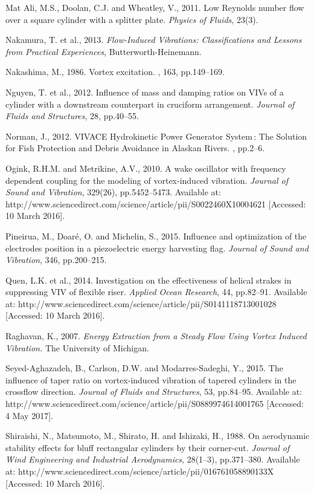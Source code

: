 \documentclass[]{article}
\begin{document}
Mat Ali, M.S., Doolan, C.J. and Wheatley, V., 2011. Low Reynolds number
flow over a square cylinder with a splitter plate. \emph{Physics of
Fluids}, 23(3).

Nakamura, T. et al., 2013. \emph{Flow-Induced Vibrations:
Classifications and Lessons from Practical Experiences},
Butterworth-Heinemann.

Nakashima, M., 1986. Vortex excitation. , 163, pp.149--169.

Nguyen, T. et al., 2012. Influence of mass and damping ratios on VIVs of
a cylinder with a downstream counterpart in cruciform arrangement.
\emph{Journal of Fluids and Structures}, 28, pp.40--55.

Norman, J., 2012. VIVACE Hydrokinetic Power Generator System : The
Solution for Fish Protection and Debris Avoidance in Alaskan Rivers. ,
pp.2--6.

Ogink, R.H.M. and Metrikine, A.V., 2010. A wake oscillator with
frequency dependent coupling for the modeling of vortex-induced
vibration. \emph{Journal of Sound and Vibration}, 329(26),
pp.5452--5473. Available at:
http://www.sciencedirect.com/science/article/pii/S0022460X10004621
{[}Accessed: 10 March 2016{]}.

Pineirua, M., Doaré, O. and Michelin, S., 2015. Influence and
optimization of the electrodes position in a piezoelectric energy
harvesting flag. \emph{Journal of Sound and Vibration}, 346,
pp.200--215.

Quen, L.K. et al., 2014. Investigation on the effectiveness of helical
strakes in suppressing VIV of flexible riser. \emph{Applied Ocean
Research}, 44, pp.82--91. Available at:
http://www.sciencedirect.com/science/article/pii/S0141118713001028
{[}Accessed: 10 March 2016{]}.

Raghavan, K., 2007. \emph{Energy Extraction from a Steady Flow Using
Vortex Induced Vibration.} The University of Michigan.

Seyed-Aghazadeh, B., Carlson, D.W. and Modarres-Sadeghi, Y., 2015. The
influence of taper ratio on vortex-induced vibration of tapered
cylinders in the crossflow direction. \emph{Journal of Fluids and
Structures}, 53, pp.84--95. Available at:
http://www.sciencedirect.com/science/article/pii/S0889974614001765
{[}Accessed: 4 May 2017{]}.

Shiraishi, N., Matsumoto, M., Shirato, H. and Ishizaki, H., 1988. On
aerodynamic stability effects for bluff rectangular cylinders by their
corner-cut. \emph{Journal of Wind Engineering and Industrial
Aerodynamics}, 28(1--3), pp.371--380. Available at:
http://www.sciencedirect.com/science/article/pii/016761058890133X
{[}Accessed: 10 March 2016{]}.
\end{document}
